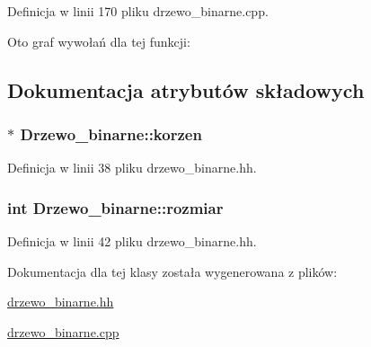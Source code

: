 \-Definicja w linii 170 pliku drzewo\-\_\-binarne.\-cpp.



\-Oto graf wywołań dla tej funkcji\-:




\subsection{\-Dokumentacja atrybutów składowych}
\hypertarget{class_drzewo__binarne_ac338d9a6b97981369e3729d11918ed8d}{
\subsubsection[{korzen}]{$\ast$ {\bf \-Drzewo\-\_\-binarne\-::korzen}}}\label{class_drzewo__binarne_ac338d9a6b97981369e3729d11918ed8d}


\-Definicja w linii 38 pliku drzewo\-\_\-binarne.\-hh.

\hypertarget{class_drzewo__binarne_a8c37bbd6488cb39a09f5a0af872941d7}{
\subsubsection[{rozmiar}]{\setlength{\rightskip}{0pt plus 5cm}int {\bf \-Drzewo\-\_\-binarne\-::rozmiar}}}\label{class_drzewo__binarne_a8c37bbd6488cb39a09f5a0af872941d7}


\-Definicja w linii 42 pliku drzewo\-\_\-binarne.\-hh.



\-Dokumentacja dla tej klasy została wygenerowana z plików\-:\begin{DoxyCompactItemize}
\item 
\hyperlink{drzewo__binarne_8hh}{drzewo\-\_\-binarne.\-hh}\item 
\hyperlink{drzewo__binarne_8cpp}{drzewo\-\_\-binarne.\-cpp}\end{DoxyCompactItemize}
